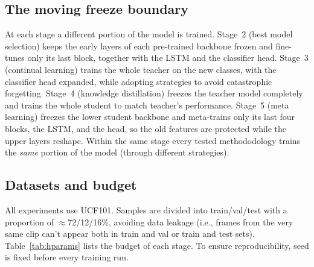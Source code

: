 \documentclass[conference]{IEEEtran}
\begin{document}
\subsection{The moving freeze boundary}
At each stage a different portion of the model is trained.
Stage~2 (best model selection) keeps the early layers of each pre-trained backbone frozen and fine-tunes only its last block, together with the LSTM and the classifier head.
Stage~3 (continual learning) trains the whole teacher on the new classes, with the classifier head expanded, while adopting strategies to avoid catastrophic forgetting.
Stage~4 (knowledge distillation) freezes the teacher model completely and trains the whole student to match teacher's performance. 
Stage~5 (meta learning) freezes the lower student backbone and meta-trains
only its last four blocks, the LSTM, and the head, so the old features are protected while
the upper layers reshape. 
Within the same stage every tested methododology trains the \emph{same} portion of the model (through different strategies).

\subsection{Datasets and budget}
All experiments use UCF101. Samples are divided into train/val/test with a proportion of $\approx$72/12/16\%, avoiding data leakage (i.e., frames from the very same clip can't appear both in train and val or train and test sets). Table~\ref{tab:hparams}
lists the budget of each stage.
To ensure reproducibility, seed is fixed before every training run.
\end{document}

